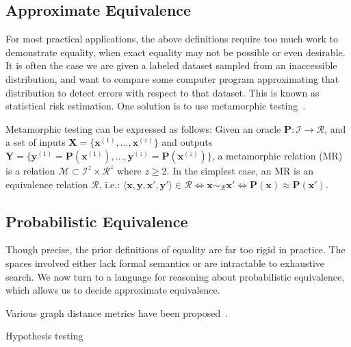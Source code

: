 \documentclass[11pt]{article}
\begin{document}
    \subsection{Approximate Equivalence}\label{sec:ap-eq}

    For most practical applications, the above definitions require too much work to demonstrate equality, when exact equality may not be possible or even desirable. It is often the case we are given a labeled dataset sampled from an inaccessible distribution, and want to compare some computer program approximating that distribution to detect errors with respect to that dataset. This is known as statistical risk estimation. One solution is to use metamorphic testing~\cite{chen2020metamorphic}.

    Metamorphic testing can be expressed as follows: Given an oracle $\mathbf P: \mathcal I \rightarrow \mathcal R$, and a set of inputs $\mathbf X = \{\mathbf{x}^{(1)}, \dots, \mathbf{x}^{(z)}\}$ and outputs $\mathbf Y = \{\mathbf{y}^{(1)} = \mathbf{P}(\mathbf{x}^{(1)}), \dots, \mathbf{y}^{(z)} = \mathbf{P}(\mathbf{x}^{(z)})\}$, a metamorphic relation (MR) is a relation $\mathcal M \subset \mathcal I^z \times \mathcal R^z$ where $z \geq 2$. In the simplest case, an MR is an equivalence relation $\mathcal R$, i.e.: $\langle \mathbf x, \mathbf y, \mathbf x', \mathbf y' \rangle \in \mathcal R \Leftrightarrow \mathbf x \sim_{\mathcal R} \mathbf x' \Leftrightarrow \mathbf P(\mathbf x) \approx \mathbf P(\mathbf x')$.

    \pagebreak\subsection{Probabilistic Equivalence}\label{sec:pr-eq}

    Though precise, the prior definitions of equality are far too rigid in practice. The spaces involved either lack formal semantics or are intractable to exhaustive search. We now turn to a language for reasoning about probabilistic equivalence, which allows us to decide approximate equivalence.



    Various graph distance metrics have been proposed~\cite{sanfeliu1983distance}.

    Hypothesis testing
\end{document}
